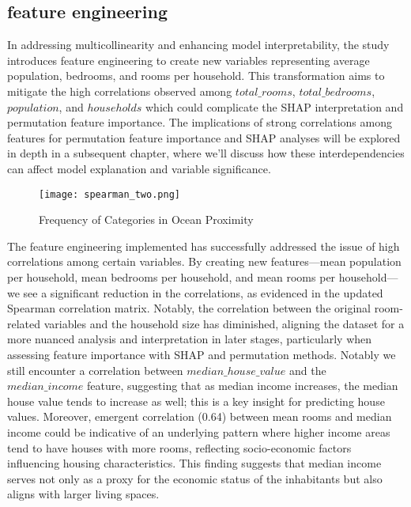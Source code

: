 \documentclass[12pt]{article}
\begin{document}
\subsection{feature engineering}
In addressing multicollinearity and enhancing model interpretability, the study introduces feature engineering to create new variables representing average population, bedrooms, and rooms per household. This transformation aims to mitigate the high correlations observed among $total\_rooms$, $total\_bedrooms$, $population$, and $households$ which could complicate the SHAP interpretation and permutation feature importance. The implications of strong correlations among features for permutation feature importance and SHAP analyses will be explored in depth in a subsequent chapter, where we'll discuss how these interdependencies can affect model explanation and variable significance.
\begin{figure}[htbp]
	\centering
	\texttt{[image: spearman\_two.png]}
	\caption{Frequency of Categories in Ocean Proximity}
	\label{fig:corr_two}
\end{figure}
The feature engineering implemented has successfully addressed the issue of high correlations among certain variables. By creating new features—mean population per household, mean bedrooms per household, and mean rooms per household—we see a significant reduction in the correlations, as evidenced in the updated Spearman correlation matrix. Notably, the correlation between the original room-related variables and the household size has diminished, aligning the dataset for a more nuanced analysis and interpretation in later stages, particularly when assessing feature importance with SHAP and permutation methods.
Notably we still encounter a correlation between $median\_house\_value$ and the $median\_income$ feature, suggesting that as median income increases, the median house value tends to increase as well; this is a key insight for predicting house values. Moreover, emergent correlation (0.64) between mean rooms and median income could be indicative of an underlying pattern where higher income areas tend to have houses with more rooms, reflecting socio-economic factors influencing housing characteristics. This finding suggests that median income serves not only as a proxy for the economic status of the inhabitants but also aligns with larger living spaces. 
\end{document}
